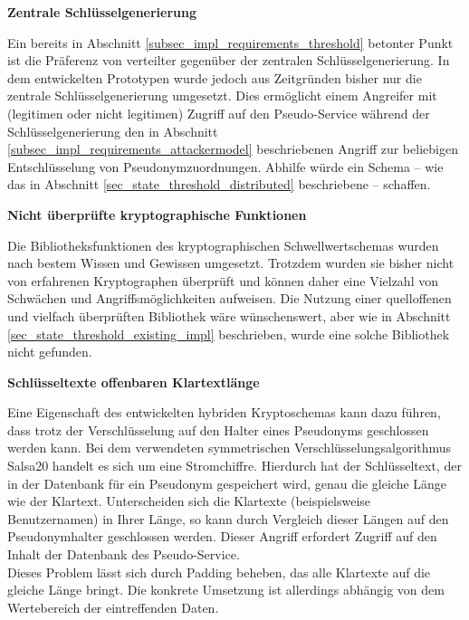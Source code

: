
\textbf{Zentrale Schlüsselgenerierung}

Ein bereits in Abschnitt \ref{subsec_impl_requirements_threshold} betonter Punkt ist die Präferenz von verteilter gegenüber der zentralen Schlüsselgenerierung. In dem entwickelten Prototypen wurde jedoch aus Zeitgründen bisher nur die zentrale Schlüsselgenerierung umgesetzt. Dies ermöglicht einem Angreifer mit (legitimen oder nicht legitimen) Zugriff auf den Pseudo-Service während der Schlüsselgenerierung den in Abschnitt \ref{subsec_impl_requirements_attackermodel} beschriebenen Angriff zur beliebigen Entschlüsselung von Pseudonymzuordnungen. Abhilfe würde ein Schema -- wie das in Abschnitt \ref{sec_state_threshold_distributed} beschriebene -- schaffen.


\textbf{Nicht überprüfte kryptographische Funktionen}

Die Bibliotheksfunktionen des kryptographischen Schwellwertschemas wurden nach bestem Wissen und Gewissen umgesetzt. Trotzdem wurden sie bisher nicht von erfahrenen Kryptographen überprüft und können daher eine Vielzahl von Schwächen und Angriffsmöglichkeiten aufweisen. Die Nutzung einer quelloffenen und vielfach überprüften Bibliothek wäre wünschenswert, aber wie in Abschnitt \ref{sec_state_threshold_existing_impl} beschrieben, wurde eine solche Bibliothek nicht gefunden.


\textbf{Schlüsseltexte offenbaren Klartextlänge}

Eine Eigenschaft des entwickelten hybriden Kryptoschemas kann dazu führen, dass trotz der Verschlüsselung auf den Halter eines Pseudonyms geschlossen werden kann. Bei dem verwendeten symmetrischen Verschlüsselungsalgorithmus Salsa20 handelt es sich um eine Stromchiffre. Hierdurch hat der Schlüsseltext, der in der Datenbank für ein Pseudonym gespeichert wird, genau die gleiche Länge wie der Klartext. Unterscheiden sich die Klartexte (beispielsweise Benutzernamen) in Ihrer Länge, so kann durch Vergleich dieser Längen auf den Pseudonymhalter geschlossen werden.  Dieser Angriff erfordert Zugriff auf den Inhalt der Datenbank des Pseudo-Service.\\
Dieses Problem lässt sich durch Padding beheben, das alle Klartexte auf die gleiche Länge bringt. Die konkrete Umsetzung ist allerdings abhängig von dem Wertebereich der eintreffenden Daten.

